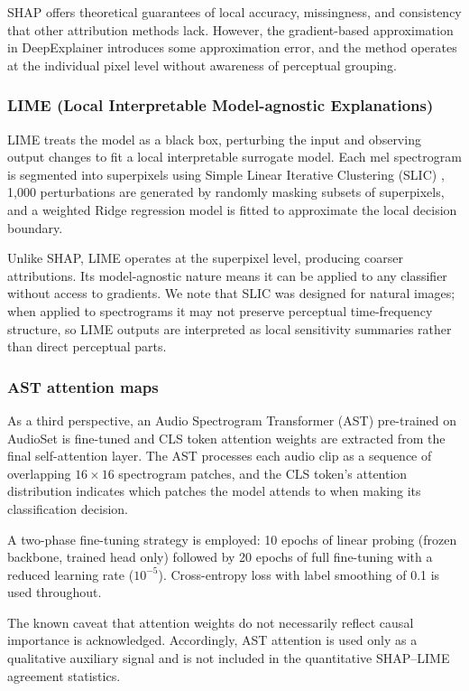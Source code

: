 \documentclass{article}
\begin{document}
SHAP offers theoretical guarantees of local accuracy, missingness, and consistency that other attribution methods lack. However, the gradient-based approximation in DeepExplainer introduces some approximation error, and the method operates at the individual pixel level without awareness of perceptual grouping.

\subsubsection{LIME (Local Interpretable Model-agnostic Explanations)}

LIME \cite{Ribeiro2016} treats the model as a black box, perturbing the input and observing output changes to fit a local interpretable surrogate model. Each mel spectrogram is segmented into superpixels using Simple Linear Iterative Clustering (SLIC) \cite{Achanta2012}, 1,000 perturbations are generated by randomly masking subsets of superpixels, and a weighted Ridge regression model is fitted to approximate the local decision boundary.

Unlike SHAP, LIME operates at the superpixel level, producing coarser attributions. Its model-agnostic nature means it can be applied to any classifier without access to gradients. We note that SLIC was designed for natural images; when applied to spectrograms it may not preserve perceptual time-frequency structure, so LIME outputs are interpreted as local sensitivity summaries rather than direct perceptual parts.

\subsubsection{AST attention maps}

As a third perspective, an Audio Spectrogram Transformer (AST) \cite{Gong2021} pre-trained on AudioSet is fine-tuned and CLS token attention weights are extracted from the final self-attention layer. The AST processes each audio clip as a sequence of overlapping $16 \times 16$ spectrogram patches, and the CLS token's attention distribution indicates which patches the model attends to when making its classification decision.

A two-phase fine-tuning strategy is employed: 10 epochs of linear probing (frozen backbone, trained head only) followed by 20 epochs of full fine-tuning with a reduced learning rate ($10^{-5}$). Cross-entropy loss with label smoothing of 0.1 is used throughout.

The known caveat that attention weights do not necessarily reflect causal importance \cite{Jain2019} is acknowledged. Accordingly, AST attention is used only as a qualitative auxiliary signal and is not included in the quantitative SHAP--LIME agreement statistics.
\end{document}
